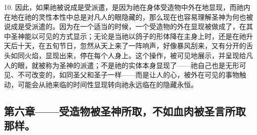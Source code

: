 10. 因此，如果祂被说成是受派遣，是因为祂在身体受造物中外在地显现，而祂内在地在祂的灵性本性中总是对凡人的眼隐藏的，那么现在也容易理解圣神为何也被说成是受派遣的。因为在一个适当的时候，一个受造物的外在显现被做成了，在其中圣神能以可见的方式显示；无论是当祂以鸽子的形体降在主身上时，还是在祂升天后十天，在五旬节日，忽然从天上来了一阵响声，好像暴风刮来，又有分开的舌头如同火焰，显现出来，停在每个人身上。这个操作，被可见地展示，并呈现给凡人的眼，就被称为圣神的派遣；不是祂的实体本身显现了——祂自己也是无形可见、不可改变的，如同圣父和圣子一样——而是让人的心，被外在可见的事物触动，可能会从祂来临的时间性显现转向祂永远临在的隐藏永恒。\par


\subsection{第六章——受造物被圣神所取，不如血肉被圣言所取那样。}

